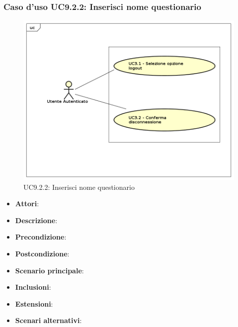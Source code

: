 		\subsubsection{Caso d'uso UC9.2.2: Inserisci nome questionario}
		\label{UC9.2.2}
		\begin{figure}[h]
			\centering
		\includegraphics[scale=0.7,keepaspectratio]{UML/UC9.png}
			\caption{UC9.2.2: Inserisci nome questionario}
		\end{figure}
		\FloatBarrier
		\begin{itemize}
			\item \textbf{Attori}: 
			\item \textbf{Descrizione}: 
			\item \textbf{Precondizione}: 
			\item \textbf{Postcondizione}: 
			\item \textbf{Scenario principale}:
			\item \textbf{Inclusioni}:
			\item \textbf{Estensioni}:
			\item \textbf{Scenari alternativi}:
		\end{itemize}
		

